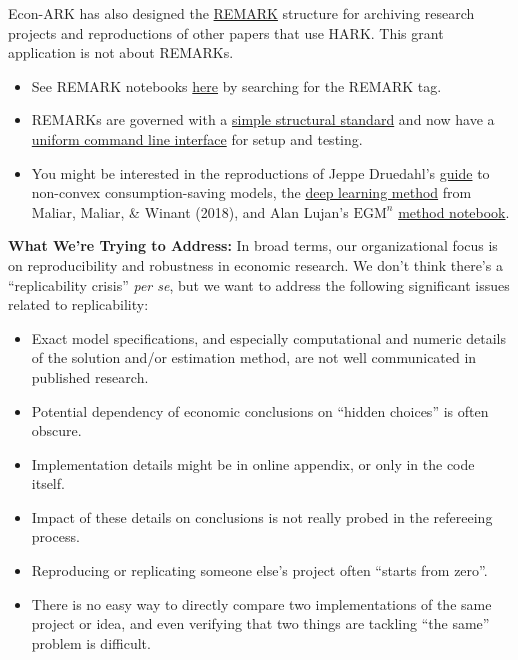 \documentclass[12pt,pdftex,letterpaper]{article}
\begin{document}
\noindent Econ-ARK has also designed the \href{https://github.com/econ-ark/REMARK}{REMARK} structure for archiving research projects and reproductions of other papers that use HARK. This grant application is not about REMARKs.

\begin{itemize}
	\item See REMARK notebooks \href{https://econ-ark.org/materials/}{here} by searching for the REMARK tag.
	
	\item REMARKs are governed with a \href{https://github.com/econ-ark/REMARK/blob/master/STANDARD.md}{simple structural standard} and now have a \href{https://github.com/econ-ark/REMARK?tab=readme-ov-file#action}{uniform command line interface} for setup and testing.
	
	\item You might be interested in the reproductions of Jeppe Druedahl's \href{https://econ-ark.org/materials/durableconsumertype/}{guide} to non-convex consumption-saving models, the \href{https://econ-ark.org/materials/deep-learning-euler-method-krusell-smith/}{deep learning method} from Maliar, Maliar, \& Winant (2018), and Alan Lujan's $\text{EGM}^n$ \href{https://econ-ark.org/materials/sequentialegm/}{method notebook}.
\end{itemize}

\vspace{0.5cm}

\noindent \textbf{What We're Trying to Address:} In broad terms, our organizational focus is on reproducibility and robustness in economic research. We don't think there's a ``replicability crisis'' \textit{per se}, but we want to address the following significant issues related to replicability:

\begin{itemize}
	\item Exact model specifications, and especially computational and numeric details of the solution and/or estimation method, are not well communicated in published research.
	
	\item Potential dependency of economic conclusions on ``hidden choices'' is often obscure.
	
	\item Implementation details might be in online appendix, or only in the code itself.
	
	\item Impact of these details on conclusions is not really probed in the refereeing process.
	
	\item Reproducing or replicating someone else's project often ``starts from zero''.
	
	\item There is no easy way to directly compare two implementations of the same project or idea, and even verifying that two things are tackling ``the same'' problem is difficult.
\end{itemize}
\end{document}
